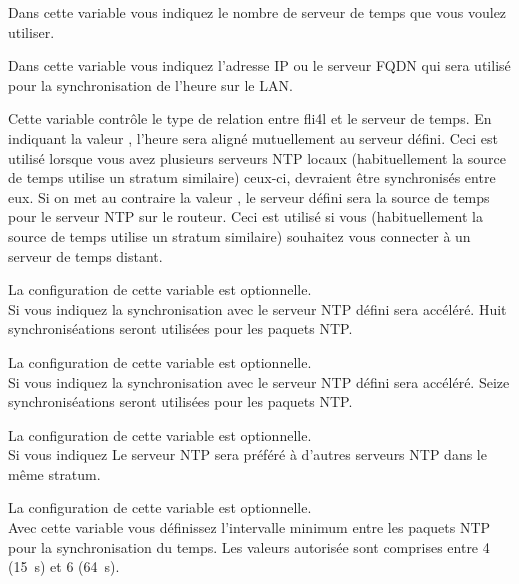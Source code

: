 \begin{description}

  Dans cette variable vous indiquez le nombre de serveur de temps que vous voulez utiliser.


  Dans cette variable vous indiquez l'adresse IP ou le serveur FQDN qui sera utilisé
  pour la synchronisation de l'heure sur le LAN.


  Cette variable contrôle le type de relation entre fli4l et le serveur de temps.
  En indiquant la valeur , l'heure sera aligné mutuellement au serveur
  défini. Ceci est utilisé lorsque vous avez plusieurs serveurs NTP locaux (habituellement
  la source de temps utilise un stratum similaire) ceux-ci, devraient être synchronisés
  entre eux. Si on met au contraire la valeur , le serveur défini sera
  la source de temps pour le serveur NTP sur le routeur. Ceci est utilisé si vous
  (habituellement la source de temps utilise un stratum similaire) souhaitez vous connecter
  à un serveur de temps distant.


  La configuration de cette variable est optionnelle.\\
  Si vous indiquez  la synchronisation avec le serveur NTP défini sera
  accéléré. Huit synchroniséations seront utilisées pour les paquets NTP.


  La configuration de cette variable est optionnelle.\\
  Si vous indiquez  la synchronisation avec le serveur NTP défini sera
  accéléré. Seize synchroniséations seront utilisées pour les paquets NTP.


  La configuration de cette variable est optionnelle.\\
  Si vous indiquez  Le serveur NTP sera préféré à d'autres serveurs NTP
  dans le même stratum.


  La configuration de cette variable est optionnelle.\\
  Avec cette variable vous définissez l'intervalle minimum entre les paquets NTP
  pour la synchronisation du temps. Les valeurs autorisée sont comprises entre
  4 (15~s) et 6 (64~s).


\end{description}
